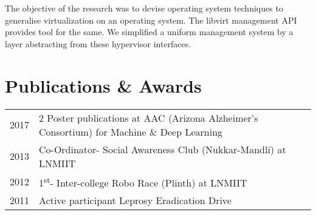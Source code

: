 \documentclass[hidelinks,letterpaper]{deedy-resume-openfont} %
\begin{document}
\begin{minipage}[t]{0.66\textwidth}
		\sectionsep
		
		\footnotesize The objective of the research was to devise operating system techniques to generalise virtualization on an operating system. The libvirt management API provides tool for the same. We simplified a uniform management system by a layer abstracting from these hypervisor interfaces.
		
		\sectionsep
		
		
		
		
		
		\vspace{-0.25cm}
		\section{Publications \& Awards} 
		
		\begin{tabular}{rll}
			2017	& 2 Poster publications at AAC (Arizona Alzheimer's Consortium) for Machine \& Deep Learning  \\ 
			2013	& Co-Ordinator- Social Awareness Club (Nukkar-Mandli) at LNMIIT\\
			2012	 & 1\textsuperscript{st}- Inter-college Robo Race (Plinth) at LNMIIT\\
			2011	& Active participant Leprosy Eradication Drive
		\end{tabular}
		
		
	\end{minipage} %
	
	
	
	
	
\end{document}
